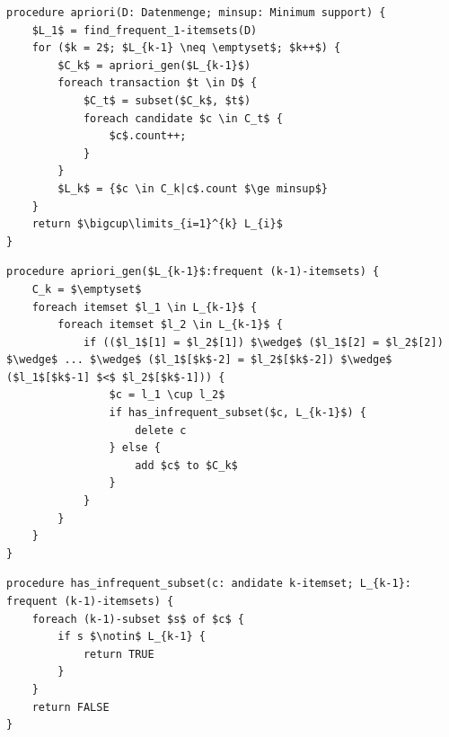 \begin{lstlisting}
procedure apriori(D: Datenmenge; minsup: Minimum support) {
	$L_1$ = find_frequent_1-itemsets(D)
	for ($k = 2$; $L_{k-1} \neq \emptyset$; $k++$) {
		$C_k$ = apriori_gen($L_{k-1}$)
		foreach transaction $t \in D$ {
			$C_t$ = subset($C_k$, $t$)
			foreach candidate $c \in C_t$ {
				$c$.count++;
			}
		}
		$L_k$ = {$c \in C_k|c$.count $\ge minsup$}
	}
	return $\bigcup\limits_{i=1}^{k} L_{i}$
}
\end{lstlisting}

\begin{lstlisting}
procedure apriori_gen($L_{k-1}$:frequent (k-1)-itemsets) {
	C_k = $\emptyset$
	foreach itemset $l_1 \in L_{k-1}$ {
		foreach itemset $l_2 \in L_{k-1}$ {
			if (($l_1$[1] = $l_2$[1]) $\wedge$ ($l_1$[2] = $l_2$[2]) $\wedge$ ... $\wedge$ ($l_1$[$k$-2] = $l_2$[$k$-2]) $\wedge$ ($l_1$[$k$-1] $<$ $l_2$[$k$-1])) {
				$c = l_1 \cup l_2$
				if has_infrequent_subset($c, L_{k-1}$) {
					delete c
				} else {
					add $c$ to $C_k$
				}
			}
		}
	}
}
\end{lstlisting}

\begin{lstlisting}
procedure has_infrequent_subset(c: andidate k-itemset; L_{k-1}: frequent (k-1)-itemsets) {
	foreach (k-1)-subset $s$ of $c$ {
		if s $\notin$ L_{k-1} {
			return TRUE
		}
	}
	return FALSE
}
\end{lstlisting}